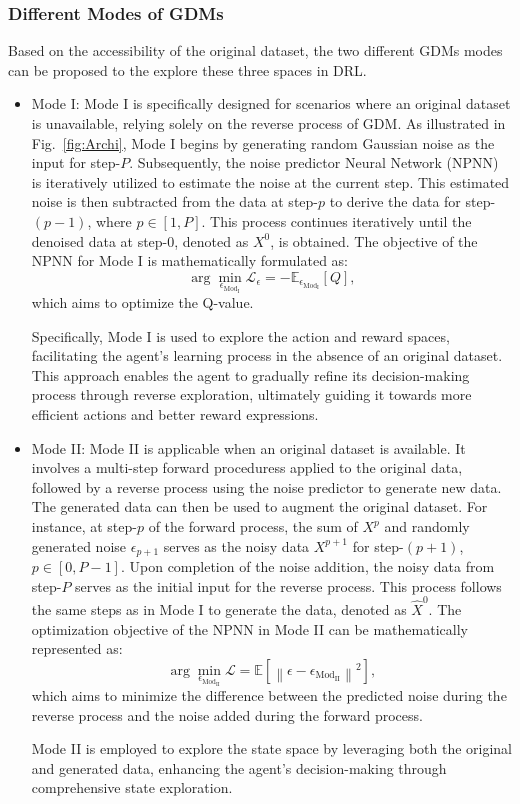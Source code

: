 \documentclass[comsoc,journal]{IEEEtran}
\begin{document}
\subsubsection{Different Modes of GDMs}Based on the accessibility of the original dataset, the two different GDMs modes can be proposed to the explore these three spaces in DRL. 
\begin{itemize}
    \item 
    Mode I: 
Mode I is specifically designed for scenarios where an original dataset is unavailable, relying solely on the reverse process of GDM. As illustrated in Fig.~\ref{fig:Archi}, Mode I begins by generating random Gaussian noise as the input for step-$P$. Subsequently, the noise predictor Neural Network (NPNN) is iteratively utilized to estimate the noise at the current step. This estimated noise is then subtracted from the data at step-$p$ to derive the data for step-$(p-1)$, where $p \in [1,P]$. This process continues iteratively until the denoised data at step-$0$, denoted as $X^0$, is obtained. The objective of the NPNN for Mode I is mathematically formulated as:
\begin{equation}
\arg\min_{\epsilon_{\text{Mod}_\text{I}}} \mathcal{L}_\epsilon = -\mathbb{E}_{\epsilon_{\text{Mod}_\text{I}}} \left[ Q \right],
\end{equation}
which aims to optimize the Q-value.

Specifically, Mode I is used to explore the action and reward spaces, facilitating the agent's learning process in the absence of an original dataset. This approach enables the agent to gradually refine its decision-making process through reverse exploration, ultimately guiding it towards more efficient actions and better reward expressions.
\item 
    Mode II: 
Mode II is applicable when an original dataset is available. It involves a multi-step forward proceduress applied to the original data, followed by a reverse process using the noise predictor to generate new data. The generated data can then be used to augment the original dataset. For instance, at step-$p$ of the forward process, the sum of $X^p$ and randomly generated noise $\epsilon_{p+1}$ serves as the noisy data $X^{p+1}$ for step-$(p+1)$, $p \in [0,P-1]$. Upon completion of the noise addition, the noisy data from step-$P$ serves as the initial input for the reverse process. This process follows the same steps as in Mode I to generate the data, denoted as $\hat{X}^{0}$. The optimization objective of the NPNN in Mode II can be mathematically represented as:
\begin{equation}
\arg\min_{\epsilon_{\text{Mod}_\text{II}}} \mathcal{L} = \mathbb{E} \left[ \left\| \epsilon - \epsilon_{{\text{Mod}_\text{II}}} \right\|^2 \right],
\end{equation} 
which aims to minimize the difference between the predicted noise during the reverse process and the noise added during the forward process. 

Mode II is employed to explore the state space by leveraging both the original and generated data, enhancing the agent's decision-making through comprehensive state exploration.
\end{itemize}
 
\end{document}
